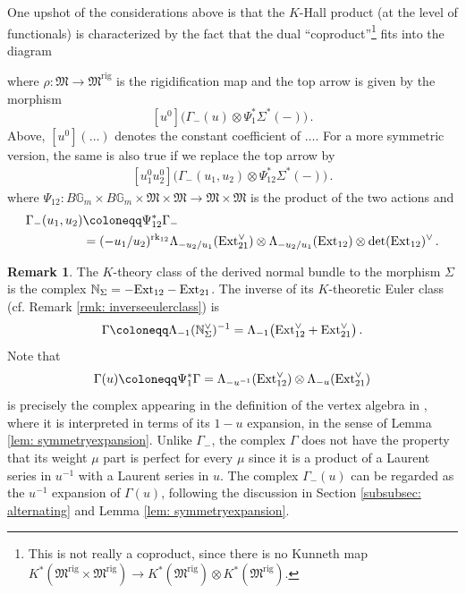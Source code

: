 \documentclass[12pt]{amsart}
\theoremstyle{definition}
\newtheorem{remark}[definition]{Remark}
\newcommand{\BG}{{\mathbb{G}}}
\newcommand{\BN}{{\mathbb{N}}}
\newcommand{\1}{\mathbf 1}
\newcommand{\FM}{{\mathfrak{M}}}
\newcommand{\Ext}{\mathcal{E}\text{xt}}
\newcommand{\rk}{\mathrm{rk}}
\newcommand{\rig}{\mathrm{rig}}
\renewcommand{\Ext}{\textup{Ext}}
\begin{document}
One upshot of the considerations above is that the $K$-Hall product (at the level of functionals) is characterized by the fact that the dual ``coproduct''\footnote{This is not really a coproduct, since there is no Kunneth map $K^\ast(\FM^\rig\times \FM^\rig)\to K^\ast(\FM^\rig)\otimes K^\ast(\FM^\rig)$.} fits into the diagram
\begin{center}
\end{center}
where $\rho\colon \FM\to \FM^\rig$ is the rigidification map and the top arrow is given by the morphism
\begin{equation}
    \label{eq: hallcoproduct}[u^0]\Big(\Gamma_-(u)\otimes \Psi_1^\ast\Sigma^\ast(-)\Big)\,.
\end{equation}
Above, $[u^0](\ldots)$ denotes the constant coefficient of $\ldots$. For a more symmetric version, the same is also true if we replace the top arrow by 
\begin{align*}
    \label{eq: hallcoproduct2}[u_1^0u_2^0]\Big(\Gamma_-(u_1, u_2)\otimes \Psi_{12}^\ast\Sigma^\ast(-)\Big)\,.
\end{align*}
where $\Psi_{12}\colon B\BG_m\times B\BG_m\times \FM\times \FM\to \FM\times \FM$ is the product of the two actions and 
\begin{align*}\Gamma_-(u_1, u_2)&\coloneqq \Psi_{12}^\ast \Gamma_-\\
&=(-u_1/u_2)^{\rk_{12}}\Lambda_{-u_2/u_1}(\Ext_{21}^\vee)\otimes  \Lambda_{-u_2/u_1}(\Ext_{12})\otimes \det(\Ext_{12})^\vee\,.\end{align*}


\begin{remark}\label{rmk: eulerclassTSigma}
The $K$-theory class of the derived normal bundle to the morphism $\Sigma$ is the complex $\BN_\Sigma=-\Ext_{12}-\Ext_{21}$. The inverse of its $K$-theoretic Euler class (cf. Remark \ref{rmk: inverseeulerclass}) is
\[\Gamma\coloneqq \Lambda_{-1}(\BN_\Sigma^\vee)^{-1}=\Lambda_{-1}\big(\Ext_{12}^\vee+\Ext_{21}^\vee\big)\,.\]
Note that
\[\Gamma(u)\coloneqq  \Psi_1^\ast \Gamma=\Lambda_{-u^{-1}}(\Ext_{12}^\vee)\otimes \Lambda_{-u}(\Ext_{21}^\vee)\]
is precisely the complex appearing in the definition of the vertex algebra in \cite{Liu}, where it is interpreted in terms of its $1-u$ expansion, in the sense of Lemma \ref{lem: symmetryexpansion}. Unlike $\Gamma_-$, the complex $\Gamma$ does not have the property that its weight $\mu$ part is perfect for every $\mu$ since it is a product of a Laurent series in $u^{-1}$ with a Laurent series in $u$. The complex $\Gamma_-(u)$ can be regarded as the $u^{-1}$ expansion of $\Gamma(u)$, following the discussion in Section \ref{subsubsec: alternating} and Lemma \ref{lem: symmetryexpansion}.
\end{remark}
\end{document}
